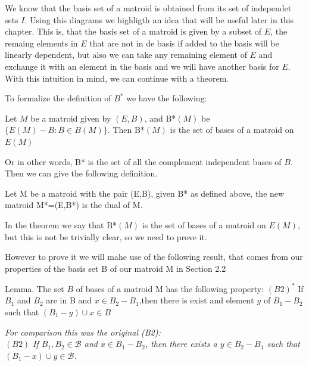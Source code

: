\begin{center}
\end{center}




We know that the basis set of a matroid is obtained from its set of independet sets $I$.
Using this diagrams we highligth an idea that will be useful later in this chapter.
This is, that the basis set of a matroid is given by a subset of $E$, the remaing elements in $E$ that are not in de basis if added to the basis will be linearly dependent, but also we can take any remaining element of $E$ and exchange it with an element in the basis and we will have another basis for $E$. With this intuition in mind, we can continue with a theorem.


To formalize the definition of $B^*$ we have the following:
\begin{theorem}
    Let $M$ be a matroid given by $(E,B)$, and B*$(M)$ be $\{E(M) - B:B\in B(M)\}$. Then B*$(M)$ is the set of bases of a matroid on $E(M)$
\end{theorem}

Or in other words, B* is the set of all the complement independent bases of $B$. Then we can give the following definition.

\begin{defn}
    Let M be a matroid with the pair (E,B), given B* as defined above, the new matroid M*=(E,B*) is the dual of M.
\end{defn}

In the theorem we say that B*$(M)$ is the set of bases of a matroid on $E(M)$, but this is not be trivially clear, so we need to prove it.

However to prove it we will mahe use of the following result, that comes from our properties of the basis set B of our matroid M in Section 2.2

Lemma. The set $B$ of bases of a matroid M has the following property:
$(B2)^*$ If $B_1$ and $B_2$ are in B and $x \in B_2 - B_1$,then there is exist and element $y$ of $B_1 - B_2$ such that $(B_1 - y) \cup x \in B$

\textit{For comparison this was the original (B2): \\
$(B2)$ If $B_1,B_2\in\mathcal{B}$ and $x\in B_1 - B_2$, then there exists a $y\in B_2 - B_1$ such that $(B_1 - x)\cup y \in\mathcal{B}$.}\\

